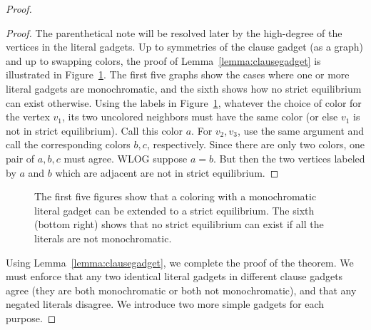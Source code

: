 \begin{proof}
\begin{proof}
The parenthetical note will be resolved later by the high-degree of the
vertices in the literal gadgets. Up to symmetries of the clause gadget (as a
graph) and up to swapping colors, the proof of Lemma~\ref{lemma:clausegadget}
is illustrated in Figure~\ref{fig:clauselemmaproof}. The first five graphs show
the cases where one or more literal gadgets are monochromatic, and the sixth
shows how no strict equilibrium can exist otherwise. Using the labels in
Figure~\ref{fig:clauselemmaproof}, whatever the choice of color for the vertex
$v_1$, its two uncolored neighbors must have the same color (or else $v_1$ is
not in strict equilibrium). Call this color $a$. For $v_2, v_3$, use the same
argument and call the corresponding colors $b, c$, respectively. Since there
are only two colors, one pair of $a,b,c$ must agree.  WLOG suppose $a=b$. But
then the two vertices labeled by $a$ and $b$ which are adjacent are not in
strict equilibrium.  
\end{proof}

\begin{figure}[h]
\centering
{}
\caption{The first five figures show that a coloring with a monochromatic
literal gadget can be extended to a strict equilibrium. The sixth (bottom
right) shows that no strict equilibrium can exist if all the literals are not
monochromatic.}
\label{fig:clauselemmaproof}
\end{figure}

Using Lemma~\ref{lemma:clausegadget}, we complete the proof of the theorem. We
must enforce that any two identical literal gadgets in different clause gadgets
agree (they are both monochromatic or both not monochromatic), and that any
negated literals disagree. We introduce two more simple gadgets for each
purpose.


\end{proof}
